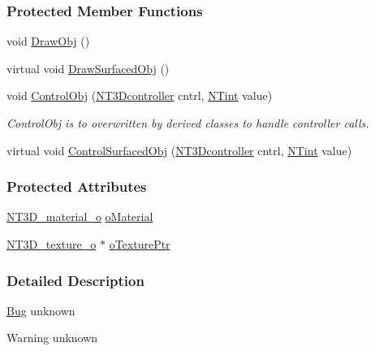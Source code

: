 \subsubsection*{Protected Member Functions}
\begin{DoxyCompactItemize}
\item 
void \hyperlink{class_n_t3_d__surfaced__object__o_aa789d793770be2e94fbf525e148318c5}{DrawObj} ()
\item 
virtual void \hyperlink{class_n_t3_d__surfaced__object__o_a36d33a50784db0850a50cd925bab5cc9}{DrawSurfacedObj} ()
\item 
void \hyperlink{class_n_t3_d__surfaced__object__o_a79cb3d9bb3b4a9ecd4f833ebb074227a}{ControlObj} (\hyperlink{nt3d__object__obj_8h_ae59ecf13a3631bc4a9ea41f90de08351}{NT3Dcontroller} cntrl, \hyperlink{nt__types_8h_aee8aa0a9869e8b5c97c6c02217ff09cd}{NTint} value)
\begin{DoxyCompactList}\small\item\em ControlObj is to overwritten by derived classes to handle controller calls. \item\end{DoxyCompactList}\item 
virtual void \hyperlink{class_n_t3_d__surfaced__object__o_a8cab0d5795fb35a049cd0b388113e7c0}{ControlSurfacedObj} (\hyperlink{nt3d__object__obj_8h_ae59ecf13a3631bc4a9ea41f90de08351}{NT3Dcontroller} cntrl, \hyperlink{nt__types_8h_aee8aa0a9869e8b5c97c6c02217ff09cd}{NTint} value)
\end{DoxyCompactItemize}
\subsubsection*{Protected Attributes}
\begin{DoxyCompactItemize}
\item 
\hyperlink{class_n_t3_d__material__o}{NT3D\_\-material\_\-o} \hyperlink{class_n_t3_d__surfaced__object__o_a48c223ebdc47fee300835b626adeee22}{oMaterial}
\item 
\hyperlink{class_n_t3_d__texture__o}{NT3D\_\-texture\_\-o} $\ast$ \hyperlink{class_n_t3_d__surfaced__object__o_adbdb2a7cc584844721c1bfc7b8acb3be}{oTexturePtr}
\end{DoxyCompactItemize}


\subsubsection{Detailed Description}
\begin{Desc}
\item[\hyperlink{bug__bug000040}{Bug}]unknown \end{Desc}
\begin{DoxyWarning}{Warning}
unknown 
\end{DoxyWarning}



